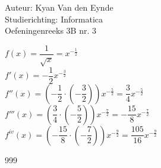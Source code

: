 \documentclass[a4paper]{article}
\begin{document}
  
\noindent \large Auteur: Kyan Van den Eynde \\
\noindent \large Studierichting: Informatica\\
\noindent \large Oefeningenreeks 3B nr. 3\\

\medskip

\normalsize

$f(x) = \dfrac{1}{\sqrt{x}} = x^{- \tfrac{1}{2}}$\\

$f'(x) = - \dfrac{1}{2}x^{- \tfrac{3}{2}}$\\

$f''(x) = \left(- \dfrac{1}{2} \cdot \left( - \dfrac{3}{2}\right)\right)x^{- \tfrac{5}{2}} = \dfrac{3}{4}x^{- \tfrac{5}{2}}$\\

$f'''(x) = \left( \dfrac{3}{4} \cdot \left( - \dfrac{5}{2}\right)\right)x^{- \tfrac{7}{2}} = - \dfrac{15}{8}x^{- \tfrac{7}{2}}$\\

$f^{iv}(x) = \left(- \dfrac{15}{8} \cdot \left( - \dfrac{7}{2} \right)\right)x^{- \tfrac{9}{2}} = \dfrac{105}{16}x^{- \tfrac{9}{2}}$\\

\begin{thebibliography}{999}
\end{thebibliography}
\end{document}
